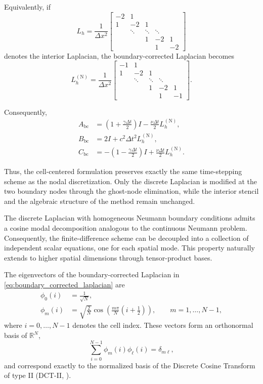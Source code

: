 \documentclass{Configuration_Files/PoliMi3i_thesis}
\begin{document}
Equivalently, if
\[
L_h
=
\frac1{\Delta x^2}
\begin{bmatrix}
-2 & 1  \\
1  & -2 & 1 \\
   & \ddots & \ddots & \ddots\\
   &&1&-2&1\\
   &&&1&-2
\end{bmatrix}
\]
denotes the interior Laplacian, the boundary-corrected Laplacian becomes
\begin{equation} \label{eq:boundary_corrected_laplacian}
L_h^{(\mathrm N)}
=
\frac1{\Delta x^2}
\begin{bmatrix}
-1 & 1 \\
1 & -2 & 1 \\
&\ddots&\ddots&\ddots\\
&&1&-2&1\\
&&&1&-1
\end{bmatrix}.
\end{equation}

Consequently,
\begin{align*}
A_{\mathrm{bc}}
&=
\left(1+\frac{\gamma\Delta t}{2}\right)I
-
\frac{\nu\Delta t}{2}
L_h^{(\mathrm N)},
\\
B_{\mathrm{bc}}
&=
2I
+
c^2\Delta t^2
L_h^{(\mathrm N)},
\\
C_{\mathrm{bc}}
&=
-\left(1-\frac{\gamma\Delta t}{2}\right)I
+
\frac{\nu\Delta t}{2}
L_h^{(\mathrm N)}.
\end{align*}

Thus, the cell-centered formulation preserves exactly the same time-stepping scheme as the nodal discretization. Only the discrete Laplacian is modified at the two boundary nodes through the ghost-node elimination, while the interior stencil and the algebraic structure of the method remain unchanged.

The discrete Laplacian with homogeneous Neumann boundary conditions admits a cosine modal decomposition analogous to the continuous Neumann problem. Consequently, the finite-difference scheme can be decoupled into a collection of independent scalar equations, one for each spatial mode. This property naturally extends to higher spatial dimensions through tensor-product bases.

The eigenvectors of the boundary-corrected Laplacian in
\eqref{eq:boundary_corrected_laplacian} are
\begin{align*}
\phi_0(i)
&=
\frac1{\sqrt N},
\\
\phi_m(i)
&=
\sqrt{\frac2N}
\cos\!\left(
\frac{m\pi}{N}
\left(i+\frac12\right)
\right),
\qquad
m=1,\ldots,N-1,
\end{align*}
where $i=0,\ldots,N-1$ denotes the cell index. These vectors form an
orthonormal basis of $\mathbb{R}^N$,
\begin{equation}
\label{eq:orthonormality}
\sum_{i=0}^{N-1}
\phi_m(i)\phi_\ell(i)
=
\delta_{m\ell},
\end{equation}
and correspond exactly to the normalized basis of the Discrete Cosine
Transform of type II (DCT-II, \cite{rao_discrete_1990}).
\end{document}

